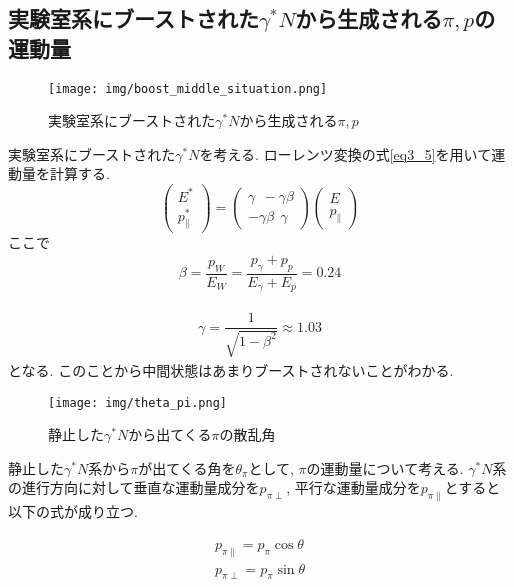 \subsection{実験室系にブーストされた$\gamma^* N$から生成される$\pi,p$の運動量}
\begin{figure}[H]
    \centering
    \texttt{[image: img/boost\_middle\_situation.png]}
    \caption{実験室系にブーストされた$\gamma^* N$から生成される$\pi,p$}
    \label{fig:angle6}
\end{figure}
実験室系にブーストされた$\gamma^* N$を考える.
ローレンツ変換の式\ref{eq3_5}を用いて運動量を計算する.
\begin{equation}
    \label{eq3_5}
    \left(\begin{array}{c}
            E^* \\
            p^*_\parallel
        \end{array}\right)
    =\left(\begin{array}{cc}
            \gamma \ \ -\gamma \beta \\
            -\gamma \beta  \ \  \gamma
        \end{array}\right)
    \left(\begin{array}{c}
            E \\
            p_\parallel
        \end{array}\right)
\end{equation}
ここで
\begin{eqnarray}
    \beta = \dfrac{p_W}{E_W} = \dfrac{p_\gamma + p_p}{E_\gamma + E_p} = 0.24
\end{eqnarray}

\begin{eqnarray}
    \gamma = \dfrac{1}{\sqrt{1 - \beta^2}} \approx 1.03
\end{eqnarray}
となる.
このことから中間状態はあまりブーストされないことがわかる.

\begin{figure}[H]
    \centering
    \texttt{[image: img/theta\_pi.png]}
    \caption{静止した$\gamma^* N$から出てくる$\pi$の散乱角}
    \label{fig:angle7}
\end{figure}

静止した$\gamma^* N$系から$\pi$が出てくる角を$\theta_\pi$として,
$\pi$の運動量について考える.
$\gamma^* N$系の進行方向に対して垂直な運動量成分を$p_{\pi \perp}$, 平行な運動量成分を$p_{\pi \parallel}$とすると以下の式が成り立つ.

\begin{eqnarray}
    p_{\pi \parallel} = p_\pi  \cos\theta \\
    p_{\pi \perp} = p_\pi \sin\theta
\end{eqnarray}

